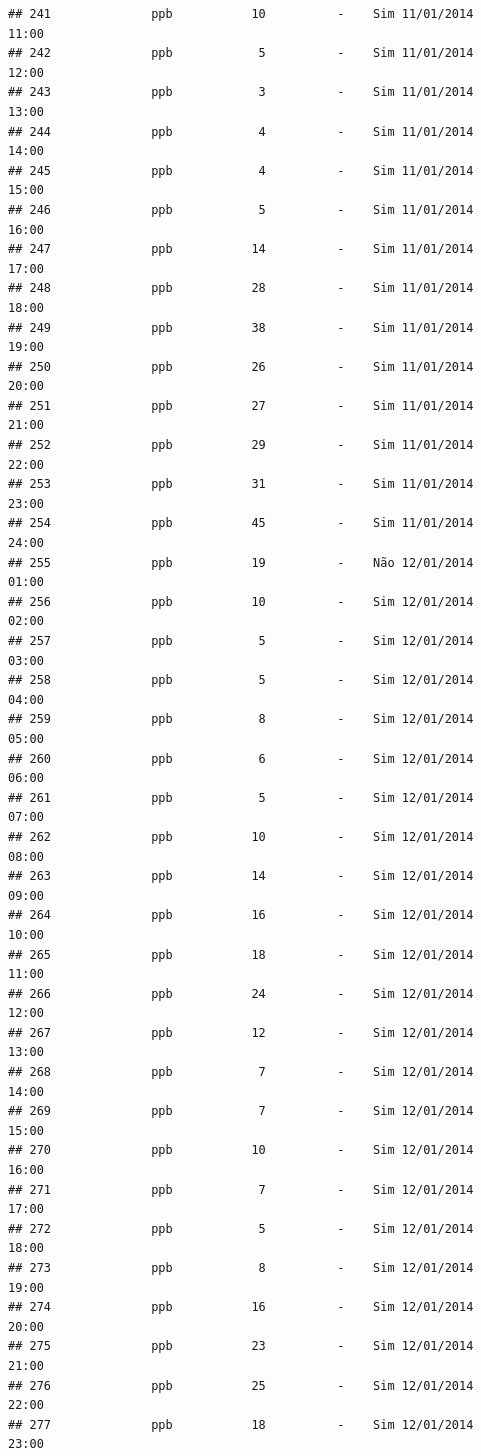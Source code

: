 \documentclass[]{book}
\begin{document}
\begin{verbatim}
## 241              ppb           10          -    Sim 11/01/2014 11:00
## 242              ppb            5          -    Sim 11/01/2014 12:00
## 243              ppb            3          -    Sim 11/01/2014 13:00
## 244              ppb            4          -    Sim 11/01/2014 14:00
## 245              ppb            4          -    Sim 11/01/2014 15:00
## 246              ppb            5          -    Sim 11/01/2014 16:00
## 247              ppb           14          -    Sim 11/01/2014 17:00
## 248              ppb           28          -    Sim 11/01/2014 18:00
## 249              ppb           38          -    Sim 11/01/2014 19:00
## 250              ppb           26          -    Sim 11/01/2014 20:00
## 251              ppb           27          -    Sim 11/01/2014 21:00
## 252              ppb           29          -    Sim 11/01/2014 22:00
## 253              ppb           31          -    Sim 11/01/2014 23:00
## 254              ppb           45          -    Sim 11/01/2014 24:00
## 255              ppb           19          -    Não 12/01/2014 01:00
## 256              ppb           10          -    Sim 12/01/2014 02:00
## 257              ppb            5          -    Sim 12/01/2014 03:00
## 258              ppb            5          -    Sim 12/01/2014 04:00
## 259              ppb            8          -    Sim 12/01/2014 05:00
## 260              ppb            6          -    Sim 12/01/2014 06:00
## 261              ppb            5          -    Sim 12/01/2014 07:00
## 262              ppb           10          -    Sim 12/01/2014 08:00
## 263              ppb           14          -    Sim 12/01/2014 09:00
## 264              ppb           16          -    Sim 12/01/2014 10:00
## 265              ppb           18          -    Sim 12/01/2014 11:00
## 266              ppb           24          -    Sim 12/01/2014 12:00
## 267              ppb           12          -    Sim 12/01/2014 13:00
## 268              ppb            7          -    Sim 12/01/2014 14:00
## 269              ppb            7          -    Sim 12/01/2014 15:00
## 270              ppb           10          -    Sim 12/01/2014 16:00
## 271              ppb            7          -    Sim 12/01/2014 17:00
## 272              ppb            5          -    Sim 12/01/2014 18:00
## 273              ppb            8          -    Sim 12/01/2014 19:00
## 274              ppb           16          -    Sim 12/01/2014 20:00
## 275              ppb           23          -    Sim 12/01/2014 21:00
## 276              ppb           25          -    Sim 12/01/2014 22:00
## 277              ppb           18          -    Sim 12/01/2014 23:00

\end{verbatim}
\end{document}
